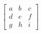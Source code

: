 \documentclass[preview]{standalone}
\begin{document}
\begin{align*}
\begin{bmatrix} a & b & c \\ d & e & f \\ g & h & i \end{bmatrix}
\end{align*}
\end{document}
